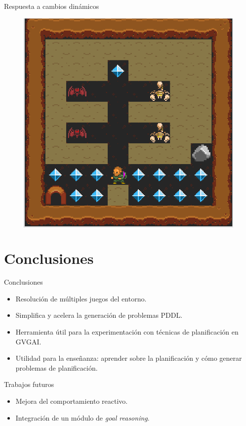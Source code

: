 \documentclass[11pt]{beamer}    %
\begin{document}
    \begin{frame}{Respuesta a cambios dinámicos}
        \begin{figure}
            \centering
            \includegraphics[scale=0.3]{img/presentation/discrepancy}
        \end{figure}
    \end{frame}

    \section{Conclusiones}

    \begin{frame}{Conclusiones}
        \begin{itemize}
            \item Resolución de múltiples juegos del entorno.
            \item Simplifica y acelera la generación de problemas PDDL.
            \item Herramienta útil para la experimentación con técnicas de planificación
            en GVGAI.
            \item Utilidad para la enseñanza: aprender sobre la planificación y cómo
            generar problemas de planificación.
        \end{itemize}
    \end{frame}

    \begin{frame}{Trabajos futuros}
        \begin{itemize}
            \item Mejora del comportamiento reactivo.
            \item Integración de un módulo de \textit{goal reasoning}.
        \end{itemize}
    \end{frame}
\end{document}
